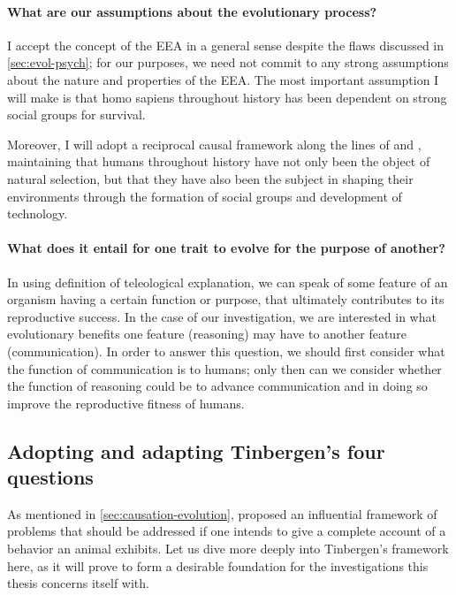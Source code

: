 \paragraph{What are our assumptions about the evolutionary process?}
I accept the concept of the EEA in a general sense despite the flaws discussed in \cref{sec:evol-psych}; for our purposes, we need not commit to any strong assumptions about the nature and properties of the EEA. The most important assumption I will make is that homo sapiens throughout history has been dependent on strong social groups for survival.

Moreover, I will adopt a reciprocal causal framework along the lines of \citet{Laland13} and \citet{Svensson18}, maintaining that humans throughout history have not only been the object of natural selection, but that they have also been the subject in shaping their environments through the formation of social groups and development of technology.

\paragraph{What does it entail for one trait to evolve for the purpose of another?}
In using  definition of teleological explanation, we can speak of some feature of an organism having a certain function or purpose, that ultimately contributes to its reproductive success. In the case of our investigation, we are interested in what evolutionary benefits one feature (reasoning) may have to another feature (communication). In order to answer this question, we should first consider what the function of communication is to humans; only then can we consider whether the function of reasoning could be to advance communication and in doing so improve the reproductive fitness of humans.

\subsection{Adopting and adapting Tinbergen's four questions}
\label{sec:tinbergen}
As mentioned in \cref{sec:causation-evolution}, \citet{Tinbergen63} proposed an influential framework of problems that should be addressed if one intends to give a complete account of a behavior an animal exhibits. Let us dive more deeply into Tinbergen's framework here, as it will prove to form a desirable foundation for the investigations this thesis concerns itself with.

